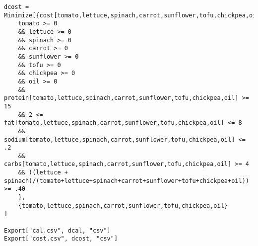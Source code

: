 \begin{verbatim}
dcost = Minimize[{cost[tomato,lettuce,spinach,carrot,sunflower,tofu,chickpea,oil],
    tomato >= 0
    && lettuce >= 0
    && spinach >= 0
    && carrot >= 0
    && sunflower >= 0
    && tofu >= 0
    && chickpea >= 0
    && oil >= 0
    && protein[tomato,lettuce,spinach,carrot,sunflower,tofu,chickpea,oil] >= 15
    && 2 <= fat[tomato,lettuce,spinach,carrot,sunflower,tofu,chickpea,oil] <= 8
    && sodium[tomato,lettuce,spinach,carrot,sunflower,tofu,chickpea,oil] <= .2
    && carbs[tomato,lettuce,spinach,carrot,sunflower,tofu,chickpea,oil] >= 4
    && ((lettuce + spinach)/(tomato+lettuce+spinach+carrot+sunflower+tofu+chickpea+oil)) >= .40
    },
    {tomato,lettuce,spinach,carrot,sunflower,tofu,chickpea,oil}
]

Export["cal.csv", dcal, "csv"]
Export["cost.csv", dcost, "csv"]
\end{verbatim}
